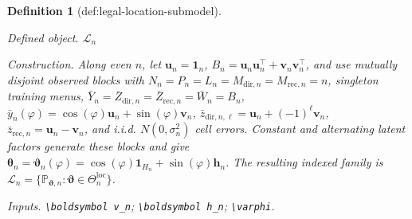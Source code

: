 \documentclass{article}
\newtheorem{definition}{Definition}
\begin{document}
\begin{definition}[def:legal-location-submodel]\label{def:legal-location-submodel}
\par\smallskip\noindent\emph{Defined object.} \(\mathcal L_n\)
\par\smallskip\noindent\emph{Construction.} Along even \(n\), let \(\boldsymbol u_n=\boldsymbol 1_n\), \(B_n=\boldsymbol u_n\boldsymbol u_n^{\top}+\boldsymbol v_n\boldsymbol v_n^{\top}\), and use mutually disjoint observed blocks with \(N_n=P_n=L_n=M_{\mathrm{dir},n}=M_{\mathrm{rec},n}=n\), singleton training menus, \(\bar Y_n=\bar Z_{\mathrm{dir},n}=\bar Z_{\mathrm{rec},n}=\bar W_n=B_n\), \(\bar y_n(\varphi)=\cos(\varphi)\boldsymbol u_n+\sin(\varphi)\boldsymbol v_n\), \(\bar z_{\mathrm{dir},n,\ell}=\boldsymbol u_n+(-1)^\ell\boldsymbol v_n\), \(\bar z_{\mathrm{rec},n}=\boldsymbol u_n-\boldsymbol v_n\), and i.i.d. \(N(0,\sigma_n^2)\) cell errors. Constant and alternating latent factors generate these blocks and give \(\boldsymbol\theta_n=\boldsymbol\vartheta_n(\varphi)=\cos(\varphi)\boldsymbol 1_{H_n}+\sin(\varphi)\boldsymbol h_n\). The resulting indexed family is \(\mathcal L_n=\{\mathbb P_{\boldsymbol\vartheta,n}:\boldsymbol\vartheta\in\Theta_n^{\mathrm{loc}}\}\).
\par\smallskip\noindent\emph{Inputs.} \texttt{\textbackslash{}\allowbreak{}boldsymbol v\_\allowbreak{}n}; \texttt{\textbackslash{}\allowbreak{}boldsymbol h\_\allowbreak{}n}; \texttt{\textbackslash{}\allowbreak{}varphi}.
\end{definition}
\end{document}
